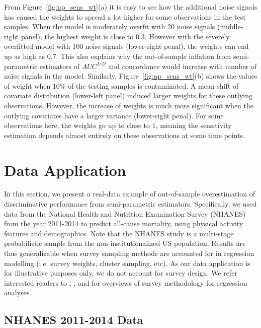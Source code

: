 \documentclass[useAMS,usenatbib, referee]{biom}
\begin{document}
From Figure~\ref{fig:np_sens_wt}(a) it is easy to see how the additional noise signals has caused the weights to spread a lot higher for some observations in the test samples. When the model is moderately overfit with 20 noise signals (middle-right panel), the highest weight is close to 0.3. However with the severely overfitted model with 100 noise signals (lower-right penal), the weights can end up as high as 0.7. This also explains why the out-of-sample inflation from semi-parametric estimators of $AUC^{I/D}$ and concordance would increase with number of noise signals in the model. Similarly, Figure~\ref{fig:np_sens_wt}(b) shows the values of weight when 10\% of the testing samples is contaminated. A mean shift of covariate distribution (lower-left panel) induced larger weights for these outlying observations. However, the increase of weights is much more significant when the outlying covariates have a larger variance (lower-right penal). For some observations here, the weights go up to close to 1, meaning the sensitivity estimation depends almost entirely on these observations at some time points. 

\section{Data Application}
\label{sec:nhanes_data}
In this section, we present a real-data example of out-of-sample overestimation of discriminative performance from semi-parametric estimators. Specifically, we used data from the National Health and Nutrition Examination Survey (NHANES) from the year 2011-2014 to predict all-cause mortality, using physical activity features and demographics. Note that the NHANES study is a multi-stage probabilistic sample from the non-institutionalized US population. Results are thus generalizable when survey sampling methods are accounted for in regression modelling (i.e. survey weights, cluster sampling. etc). As our data application is for illustrative purposes only, we do not account for survey design. We refer interested readers to \citet{Lumley2004}, \citet{KornandGraubard2011}, and \citet{skinner2017} for overviews of survey methodology for regression analyses. 


\subsection{NHANES 2011-2014 Data}
 
\end{document}
